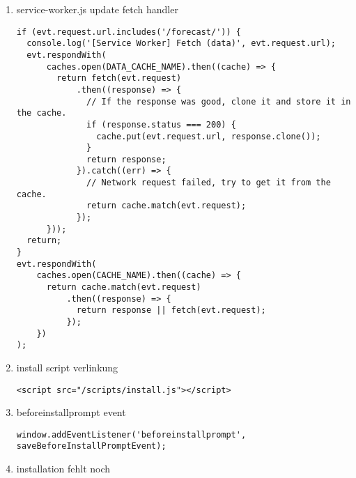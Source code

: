 \documentclass[oneside]{book}%
\begin{document}
\begin{appendix}
\begin{enumerate}
\item service-worker.js update fetch handler
\begin{lstlisting}
if (evt.request.url.includes('/forecast/')) {
  console.log('[Service Worker] Fetch (data)', evt.request.url);
  evt.respondWith(
      caches.open(DATA_CACHE_NAME).then((cache) => {
        return fetch(evt.request)
            .then((response) => {
              // If the response was good, clone it and store it in the cache.
              if (response.status === 200) {
                cache.put(evt.request.url, response.clone());
              }
              return response;
            }).catch((err) => {
              // Network request failed, try to get it from the cache.
              return cache.match(evt.request);
            });
      }));
  return;
}
evt.respondWith(
    caches.open(CACHE_NAME).then((cache) => {
      return cache.match(evt.request)
          .then((response) => {
            return response || fetch(evt.request);
          });
    })
);
\end{lstlisting}


\item install script verlinkung
\begin{lstlisting}
<script src="/scripts/install.js"></script>
\end{lstlisting}


\item beforeinstallprompt event
\begin{lstlisting}
window.addEventListener('beforeinstallprompt', saveBeforeInstallPromptEvent);
\end{lstlisting}

\item installation fehlt noch

\end{enumerate}



\end{appendix}


\end{document}
